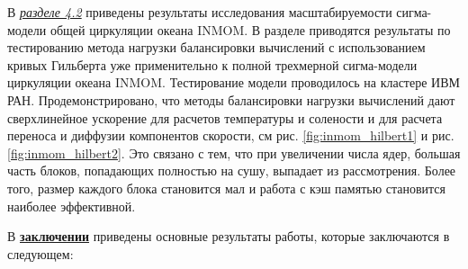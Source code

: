 В \underline{\textit{разделе 4.2}} приведены результаты исследования масштабируемости сигма-модели общей циркуляции океана INMOM.
В разделе приводятся результаты по тестированию метода нагрузки балансировки вычислений с использованием кривых Гильберта уже примени­тельно к полной трехмерной сигма-модели циркуляции океана INMOM. Тестирование модели проводилось на кластере ИВМ РАН.
Продемонстрировано, что методы балансировки нагрузки вычислений дают сверхлинейное ускорение для расче­тов температуры и солености и для расчета переноса и диффузии компонентов скорости, см рис. \ref{fig:inmom_hilbert1} и рис. \ref{fig:inmom_hilbert2}.
Это связано с тем, что при увеличении числа ядер, большая часть блоков, попадающих полностью на сушу, выпадает из рассмотрения. Более то­го, размер каждого блока становится мал и работа с кэш памятью становится наиболее эффективной.

\FloatBarrier
{}                                  %
В \underline{\textbf{заключении}} приведены основные результаты работы, которые заключаются в следующем:




